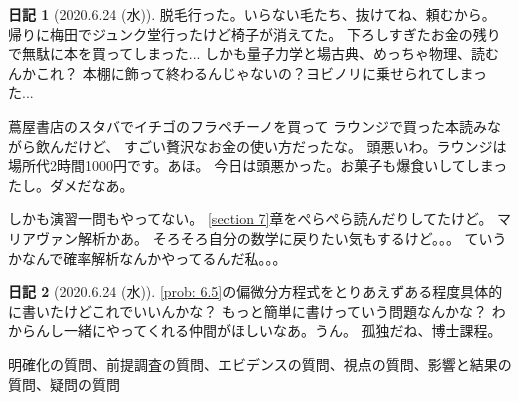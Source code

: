 \documentclass[uplatex]{jsarticle}
\theoremstyle{definition}
\newtheorem*{nikki*}{日記}
\begin{document}
\begin{nikki*}[2020.6.24 (水)]
  脱毛行った。いらない毛たち、抜けてね、頼むから。
  帰りに梅田でジュンク堂行ったけど椅子が消えてた。
  下ろしすぎたお金の残りで無駄に本を買ってしまった...
  しかも量子力学と場古典、めっちゃ物理、読むんかこれ？
  本棚に飾って終わるんじゃないの？ヨビノリに乗せられてしまった...

  蔦屋書店のスタバでイチゴのフラペチーノを買って
  ラウンジで買った本読みながら飲んだけど、
  すごい贅沢なお金の使い方だったな。
  頭悪いわ。ラウンジは場所代2時間1000円です。あほ。
  今日は頭悪かった。お菓子も爆食いしてしまったし。ダメだなあ。

  しかも演習一問もやってない。
  \ref{section 7}章をぺらぺら読んだりしてたけど。
  マリアヴァン解析かあ。
  そろそろ自分の数学に戻りたい気もするけど。。。
  ていうかなんで確率解析なんかやってるんだ私。。。
\end{nikki*}



\begin{nikki*}[2020.6.24 (水)]
  \autoref{prob: 6.5}の偏微分方程式をとりあえずある程度具体的に書いたけどこれでいいんかな？
  もっと簡単に書けっていう問題なんかな？
  わからんし一緒にやってくれる仲間がほしいなあ。うん。
  孤独だね、博士課程。
\end{nikki*}



明確化の質問、前提調査の質問、エビデンスの質問、視点の質問、影響と結果の質問、疑問の質問
\end{document}
